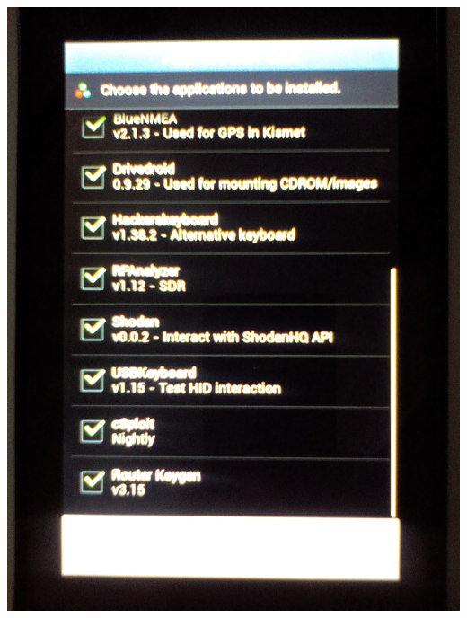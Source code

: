 \documentclass[11pt,a4paper]{article}
\begin{document}
\includegraphics[scale=0.09]{./Image/img17} \\ \\
\end{document}
